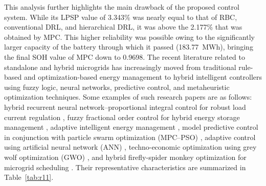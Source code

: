 \documentclass[journal]{IEEEtran}
\begin{document}
This analysis further highlights the main drawback of the proposed control system.
While its LPSP value of 3.343\% was nearly equal to that of RBC, conventional DRL, and hierarchical DRL, it was above the 2.177\% that was obtained by MPC. This higher reliability was possible owing to the significantly larger capacity of the battery through which it passed (183.77~MWh), bringing the final SOH value of MPC down to 0.9698. The recent literature related to standalone and hybrid microgrids has increasingly moved from traditional rule-based and optimization-based energy management to hybrid intelligent controllers using fuzzy logic, neural networks, predictive control, and metaheuristic optimization techniques. Some examples of such research papers are as follows: hybrid recurrent neural network–proportional integral control for robust load current regulation \cite{Aghmadi2025}, fuzzy fractional order control for hybrid energy storage management \cite{Kumar2023}, adaptive intelligent energy management \cite{Rajput2025}, model predictive control in conjunction with particle swarm optimization (MPC–PSO) \cite{Veni2025}, adaptive control using artificial neural network (ANN) \cite{Adiche2024}, techno-economic optimization using grey wolf optimization (GWO) \cite{Tukkee2024}, and hybrid firefly-spider monkey optimization for microgrid scheduling \cite{Pramila2024}. Their representative characteristics are summarized in Table~\ref{tab:r11}.
\end{document}
